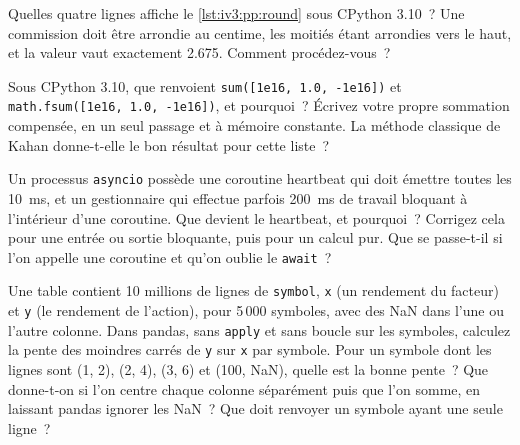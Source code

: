 \begin{question}\label{iq:iv3:python-and-pandas:27}
Quelles quatre lignes affiche le \cref{lst:iv3:pp:round} sous CPython 3.10~? Une commission doit être arrondie au centime, les moitiés étant arrondies vers le haut, et la valeur vaut exactement 2.675. Comment procédez-vous~?
\label{lst:iv3:pp:round}
\end{question}

\begin{question}\label{iq:iv3:python-and-pandas:28}
Sous CPython 3.10, que renvoient \texttt{sum([1e16, 1.0, -1e16])} et \texttt{math.fsum([1e16, 1.0, -1e16])}, et pourquoi~? Écrivez votre propre sommation compensée, en un seul passage et à mémoire constante. La méthode classique de Kahan donne-t-elle le bon résultat pour cette liste~?
\end{question}

\begin{question}\label{iq:iv3:python-and-pandas:29}
Un processus \texttt{asyncio} possède une coroutine heartbeat qui doit émettre toutes les 10~ms, et un gestionnaire qui effectue parfois 200~ms de travail bloquant à l'intérieur d'une coroutine. Que devient le heartbeat, et pourquoi~? Corrigez cela pour une entrée ou sortie bloquante, puis pour un calcul pur. Que se passe-t-il si l'on appelle une coroutine et qu'on oublie le \texttt{await}~?
\end{question}

\begin{question}\label{iq:iv3:python-and-pandas:30}
Une table contient 10 millions de lignes de \texttt{symbol}, \texttt{x} (un rendement du facteur) et \texttt{y} (le rendement de l'action), pour 5\,000 symboles, avec des NaN dans l'une ou l'autre colonne. Dans pandas, sans \texttt{apply} et sans boucle sur les symboles, calculez la pente des moindres carrés de \texttt{y} sur \texttt{x} par symbole. Pour un symbole dont les lignes sont (1, 2), (2, 4), (3, 6) et (100, NaN), quelle est la bonne pente~? Que donne-t-on si l'on centre chaque colonne séparément puis que l'on somme, en laissant pandas ignorer les NaN~? Que doit renvoyer un symbole ayant une seule ligne~?
\end{question}

